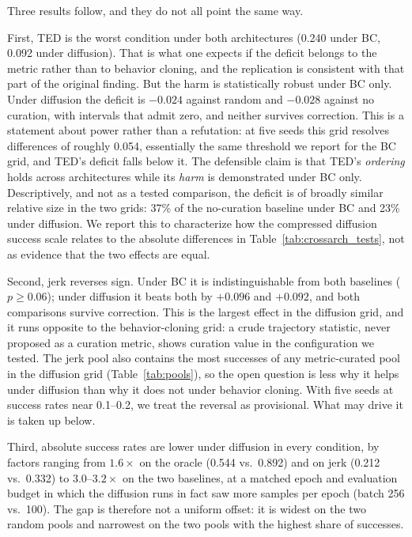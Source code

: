 \documentclass[10pt]{article}
\begin{document}
Three results follow, and they do not all point the same way.

First, TED is the worst condition under both architectures (0.240 under BC,
0.092 under diffusion). That is what one expects if the deficit belongs to
the metric rather than to behavior cloning, and the replication is
consistent with that part of the original finding. But the harm is statistically
robust under BC only. Under diffusion the deficit is $-0.024$ against random
and $-0.028$ against no curation, with intervals that admit zero, and
neither survives correction. This is a statement about power rather than a
refutation: at five seeds this grid resolves differences of roughly 0.054,
essentially the same threshold we report for the BC grid, and TED's deficit
falls below it. The defensible claim is that TED's \emph{ordering} holds
across architectures while its \emph{harm} is demonstrated under BC only.
Descriptively, and not as a tested comparison, the deficit is of broadly
similar relative size in the two grids: 37\% of the no-curation baseline
under BC and 23\% under diffusion. We report this to characterize how the
compressed diffusion success scale relates to the absolute differences in
Table~\ref{tab:crossarch_tests}, not as evidence that the two effects are
equal.

Second, jerk reverses sign. Under BC it is indistinguishable from both
baselines ($p \geq 0.06$); under diffusion it beats both by $+0.096$ and
$+0.092$, and both comparisons survive correction. This is the largest
effect in the diffusion grid, and it runs opposite to the behavior-cloning
grid: a crude trajectory statistic, never proposed as a curation metric,
shows curation value in the configuration we tested. The jerk
pool also contains the most successes of any metric-curated pool in the
diffusion grid (Table~\ref{tab:pools}), so the open question is less why it helps under
diffusion than why it does not under behavior cloning. With five seeds at
success rates near 0.1--0.2, we treat the reversal as provisional. What may
drive it is taken up below.

Third, absolute success rates are lower under diffusion in every condition,
by factors ranging from $1.6\times$ on the oracle (0.544 vs.\ 0.892) and on
jerk (0.212 vs.\ 0.332) to $3.0$--$3.2\times$ on the two baselines, at a
matched epoch and evaluation budget in which the diffusion runs in fact saw
more samples per epoch (batch 256 vs.\ 100). The gap is therefore not a
uniform offset: it is widest on the two random pools and narrowest on the
two pools with the highest share of successes.
\end{document}
